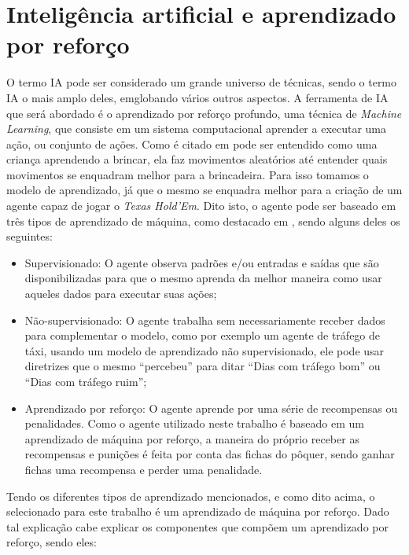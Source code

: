 \section{Inteligência artificial e aprendizado por reforço}
O termo \gls{IA} pode ser considerado um grande universo de técnicas, sendo o termo \gls{IA} o mais amplo deles, emglobando vários outros aspectos. A ferramenta de \gls{IA}  que será abordado é o aprendizado por reforço profundo, uma técnica de \textit{Machine Learning}, que consiste em um sistema computacional aprender a executar uma ação, ou conjunto de ações. Como é citado em  pode ser entendido como uma criança aprendendo a brincar, ela faz movimentos aleatórios até entender quais movimentos se enquadram melhor para a brincadeira.
Para isso tomamos o modelo de aprendizado, já que o mesmo se enquadra melhor para a criação de um agente capaz de jogar o \textit{Texas Hold'Em}. Dito isto, o agente pode ser baseado em três tipos de aprendizado de máquina, como destacado em , sendo alguns deles os seguintes:
\begin{itemize}
      \item Supervisionado: O agente observa padrões e/ou entradas e saídas que são disponibilizadas para que o mesmo aprenda da melhor maneira como usar aqueles dados para executar suas ações;

      \item Não-supervisionado: O agente trabalha sem necessariamente receber dados para complementar o modelo, como por exemplo um agente de tráfego de táxi, usando um modelo de aprendizado não supervisionado, ele pode usar diretrizes que o mesmo ``percebeu'' para ditar ``Dias com tráfego bom'' ou ``Dias com tráfego ruim'';

      \item Aprendizado por reforço: O agente aprende por uma série de recompensas ou penalidades. Como o agente utilizado neste trabalho é baseado em um aprendizado de máquina por reforço, a maneira do próprio receber as recompensas e punições é feita por conta das fichas do pôquer, sendo ganhar fichas uma recompensa e perder uma penalidade.

\end{itemize}

Tendo os diferentes tipos de aprendizado mencionados, e como dito acima, o selecionado para este trabalho é um aprendizado de máquina por reforço. Dado tal explicação cabe explicar os componentes que compõem um aprendizado por reforço, sendo eles:

